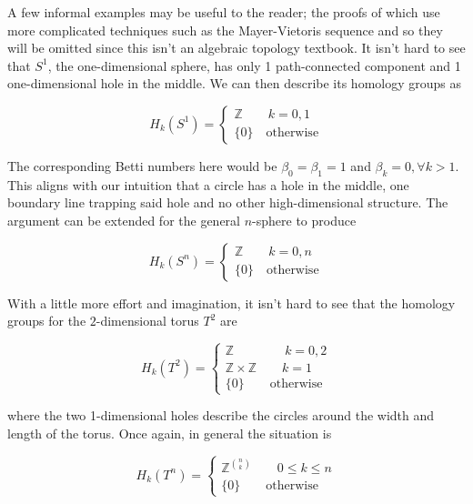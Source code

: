 A few informal examples may be useful to the reader; the proofs of which use more complicated techniques such as the Mayer-Vietoris sequence and so they will be omitted since this isn't an algebraic topology textbook. It isn't hard to see that $S^{1}$, the one-dimensional sphere, has only 1 path-connected component and 1 one-dimensional hole in the middle. We can then describe its homology groups as

\begin{equation*}
  H_{k}(S^{1}) = \begin{cases}
    \mathbb{Z} \qquad k = 0,1 \\
    \{0\} \quad \text{otherwise}
                \end{cases}
\end{equation*}

The corresponding Betti numbers here would be $\beta_{0} = \beta_{1} = 1$ and $\beta_{k} = 0, \forall k > 1$. This aligns with our intuition that a circle has a hole in the middle, one boundary line trapping said hole and no other high-dimensional structure. The argument can be extended for the general $n$-sphere to produce

\begin{equation*}
  H_{k}(S^{n}) = \begin{cases}
    \mathbb{Z} \qquad k = 0,n \\
    \{0\} \quad \text{otherwise}
                \end{cases}
\end{equation*}

With a little more effort and imagination, it isn't hard to see that the homology groups for the $2$-dimensional torus $T^{2}$ are

\begin{equation*}
  H_{k}(T^{2}) = \begin{cases}
    \mathbb{Z} \qquad \qquad k = 0,2 \\
    \mathbb{Z} \times \mathbb{Z} \qquad k = 1 \\
    \{0\} \qquad \text{otherwise}
                \end{cases}
\end{equation*}

where the two 1-dimensional holes describe the circles around the width and length of the torus. Once again, in general the situation is

\begin{equation*}
  H_{k}(T^{n}) = \begin{cases}
    \mathbb{Z}^{\binom{n}{k}} \qquad 0 \leq k \leq n  \\
    \{0\} \qquad \text{otherwise}
                \end{cases}
\end{equation*}

